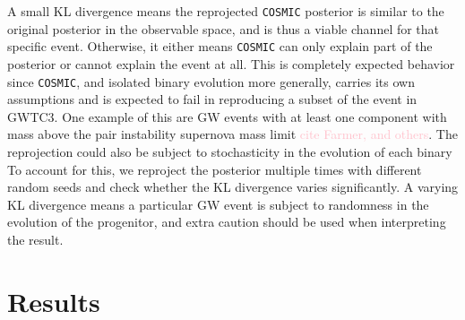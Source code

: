 \documentclass[twocolumn]{aastex631}
\newcommand{\kb}[1]{\textcolor{pink}{#1}}
\begin{document}
A small KL divergence means the reprojected \texttt{COSMIC} posterior is similar to the original posterior in the 
observable space, and is thus a viable channel for that specific event. Otherwise, it either means \texttt{COSMIC} 
can only explain part of the posterior or cannot explain the event at all. This is completely expected behavior since 
\texttt{COSMIC}, and isolated binary evolution more generally, carries its own assumptions and is expected to 
fail in reproducing a subset of the event in GWTC3. One example of this are GW events with at least one component 
with mass above the pair instability supernova mass limit \kb{cite Farmer, and others}.
The reprojection could also be subject to stochasticity in the evolution of each binary
To account for this, we reproject the posterior multiple times with different random seeds and 
check whether the KL divergence varies significantly. A varying KL divergence means a particular GW event is subject 
to randomness in the evolution of the progenitor, and extra caution should be used when interpreting the result.


\section{Results}
\label{sec:result}
    
\end{document}
